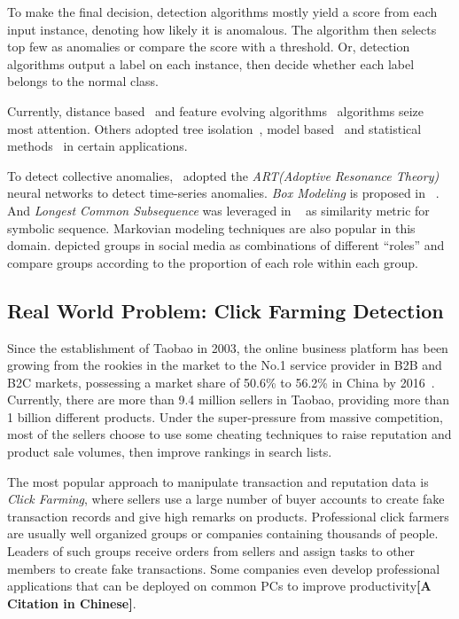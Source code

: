 \documentclass[a4paper]{IEEEtran}
\begin{document}
			To make the final decision, detection algorithms mostly yield a score from each input instance, denoting how likely it is anomalous. The algorithm then selects top few as anomalies or compare the score with a threshold. Or, detection algorithms output a label on each instance, then decide whether each label belongs to the normal class.
			
			Currently, distance based~\cite{cao2014scalable,cao2017multi} and feature evolving algorithms~\cite{masud2013classification,li2015discovery,shao2014prototype} algorithms seize most attention. Others adopted tree isolation~\cite{zhang2017lshiforest}, model based~\cite{yin2016model} and statistical methods~\cite{zhu2002statstream} in certain applications.
			
			To detect collective anomalies,~\cite{caudell1993adaptive} adopted the \textit{ART(Adoptive Resonance Theory)} neural networks to detect time-series anomalies. \textit{Box Modeling} is proposed in ~\cite{chan2005modeling}. And \textit{Longest Common Subsequence} was leveraged in ~\cite{budalakoti2006anomaly} as similarity metric for symbolic sequence. Markovian modeling techniques are also popular in this domain\cite{ye2000markov,warrender1999detecting,pavlov2003sequence}. \cite{yu2015glad} depicted groups in social media as combinations of different ``roles'' and compare groups according to the proportion of each role within each group.
			
		\subsection{Real World Problem: Click Farming Detection}\label{sec:related-realworld}
			Since the establishment of Taobao in 2003, the online business platform has been growing from the rookies in the market to the No.1 service provider in B2B and B2C markets, possessing a market share of 50.6\% to 56.2\% in China by 2016~\cite{iresearch2016b2c}. Currently, there are more than 9.4 million sellers in Taobao, providing more than 1 billion different products. Under the super-pressure from massive competition, most of the sellers choose to use some cheating techniques to raise reputation and product sale volumes, then improve rankings in search lists.
			
			The most popular approach to manipulate transaction and reputation data is \textit{Click Farming}, where sellers use a large number of buyer accounts to create fake transaction records and give high remarks on products. Professional click farmers are usually well organized groups or companies containing thousands of people. Leaders of such groups receive orders from sellers and assign tasks to other members to create fake transactions. Some companies even develop professional applications that can be deployed on common PCs to improve productivity\textbf{[A Citation in Chinese]}.
			
\end{document}

